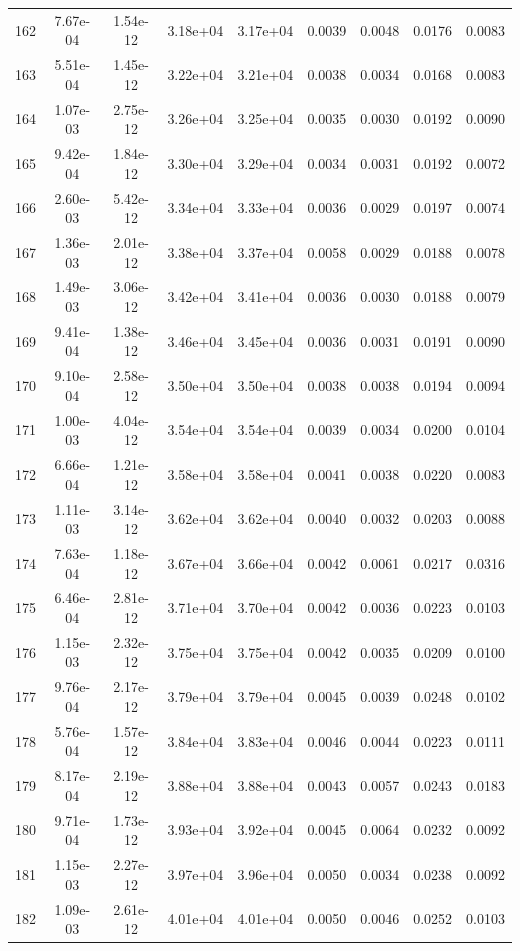 \begin{longtable}{ccccccccc}
162 & 7.67e-04 & 1.54e-12 & 3.18e+04 & 3.17e+04 & 0.0039 & 0.0048 & 0.0176 & 0.0083 \\
163 & 5.51e-04 & 1.45e-12 & 3.22e+04 & 3.21e+04 & 0.0038 & 0.0034 & 0.0168 & 0.0083 \\
164 & 1.07e-03 & 2.75e-12 & 3.26e+04 & 3.25e+04 & 0.0035 & 0.0030 & 0.0192 & 0.0090 \\
165 & 9.42e-04 & 1.84e-12 & 3.30e+04 & 3.29e+04 & 0.0034 & 0.0031 & 0.0192 & 0.0072 \\
166 & 2.60e-03 & 5.42e-12 & 3.34e+04 & 3.33e+04 & 0.0036 & 0.0029 & 0.0197 & 0.0074 \\
167 & 1.36e-03 & 2.01e-12 & 3.38e+04 & 3.37e+04 & 0.0058 & 0.0029 & 0.0188 & 0.0078 \\
168 & 1.49e-03 & 3.06e-12 & 3.42e+04 & 3.41e+04 & 0.0036 & 0.0030 & 0.0188 & 0.0079 \\
169 & 9.41e-04 & 1.38e-12 & 3.46e+04 & 3.45e+04 & 0.0036 & 0.0031 & 0.0191 & 0.0090 \\
170 & 9.10e-04 & 2.58e-12 & 3.50e+04 & 3.50e+04 & 0.0038 & 0.0038 & 0.0194 & 0.0094 \\
171 & 1.00e-03 & 4.04e-12 & 3.54e+04 & 3.54e+04 & 0.0039 & 0.0034 & 0.0200 & 0.0104 \\
172 & 6.66e-04 & 1.21e-12 & 3.58e+04 & 3.58e+04 & 0.0041 & 0.0038 & 0.0220 & 0.0083 \\
173 & 1.11e-03 & 3.14e-12 & 3.62e+04 & 3.62e+04 & 0.0040 & 0.0032 & 0.0203 & 0.0088 \\
174 & 7.63e-04 & 1.18e-12 & 3.67e+04 & 3.66e+04 & 0.0042 & 0.0061 & 0.0217 & 0.0316 \\
175 & 6.46e-04 & 2.81e-12 & 3.71e+04 & 3.70e+04 & 0.0042 & 0.0036 & 0.0223 & 0.0103 \\
176 & 1.15e-03 & 2.32e-12 & 3.75e+04 & 3.75e+04 & 0.0042 & 0.0035 & 0.0209 & 0.0100 \\
177 & 9.76e-04 & 2.17e-12 & 3.79e+04 & 3.79e+04 & 0.0045 & 0.0039 & 0.0248 & 0.0102 \\
178 & 5.76e-04 & 1.57e-12 & 3.84e+04 & 3.83e+04 & 0.0046 & 0.0044 & 0.0223 & 0.0111 \\
179 & 8.17e-04 & 2.19e-12 & 3.88e+04 & 3.88e+04 & 0.0043 & 0.0057 & 0.0243 & 0.0183 \\
180 & 9.71e-04 & 1.73e-12 & 3.93e+04 & 3.92e+04 & 0.0045 & 0.0064 & 0.0232 & 0.0092 \\
181 & 1.15e-03 & 2.27e-12 & 3.97e+04 & 3.96e+04 & 0.0050 & 0.0034 & 0.0238 & 0.0092 \\
182 & 1.09e-03 & 2.61e-12 & 4.01e+04 & 4.01e+04 & 0.0050 & 0.0046 & 0.0252 & 0.0103 \\

\end{longtable}
